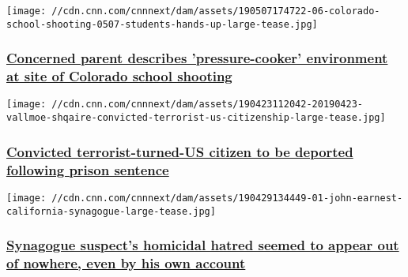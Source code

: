 \href{/2019/05/09/us/colorado-shooting-stem-school-concerned-parent-invs/index.html}{}

\texttt{[image: //cdn.cnn.com/cnnnext/dam/assets/190507174722-06-colorado-school-shooting-0507-students-hands-up-large-tease.jpg]}

\hypertarget{concerned-parent-describes-pressure-cooker-environment-at-site-of-colorado-school-shooting}{%
\subsubsection{\texorpdfstring{\href{/2019/05/09/us/colorado-shooting-stem-school-concerned-parent-invs/index.html}{Concerned
parent describes 'pressure-cooker' environment at site of Colorado
school
shooting}}{Concerned parent describes 'pressure-cooker' environment at site of Colorado school shooting}}\label{concerned-parent-describes-pressure-cooker-environment-at-site-of-colorado-school-shooting}}

\href{/2019/04/26/us/convicted-terrorist-turned-us-citizen-sentenced-invs/index.html}{}

\texttt{[image: //cdn.cnn.com/cnnnext/dam/assets/190423112042-20190423-vallmoe-shqaire-convicted-terrorist-us-citizenship-large-tease.jpg]}

\hypertarget{convicted-terrorist-turned-us-citizen-to-be-deported-following-prison-sentence}{%
\subsubsection{\texorpdfstring{\href{/2019/04/26/us/convicted-terrorist-turned-us-citizen-sentenced-invs/index.html}{Convicted
terrorist-turned-US citizen to be deported following prison
sentence}}{Convicted terrorist-turned-US citizen to be deported following prison sentence}}\label{convicted-terrorist-turned-us-citizen-to-be-deported-following-prison-sentence}}

\href{/2019/04/30/us/california-synagogue-attack-john-earnest/index.html}{}

\texttt{[image: //cdn.cnn.com/cnnnext/dam/assets/190429134449-01-john-earnest-california-synagogue-large-tease.jpg]}

\hypertarget{synagogue-suspects-homicidal-hatred-seemed-to-appear-out-of-nowhere-even-by-his-own-account}{%
\subsubsection{\texorpdfstring{\href{/2019/04/30/us/california-synagogue-attack-john-earnest/index.html}{Synagogue
suspect's homicidal hatred seemed to appear out of nowhere, even by his
own
account}}{Synagogue suspect's homicidal hatred seemed to appear out of nowhere, even by his own account}}\label{synagogue-suspects-homicidal-hatred-seemed-to-appear-out-of-nowhere-even-by-his-own-account}}

